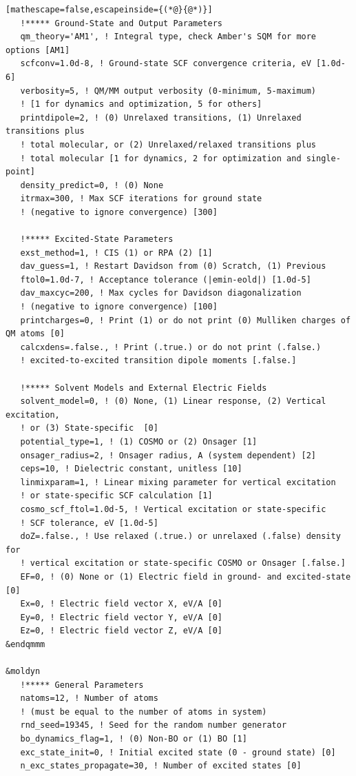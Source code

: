 \documentclass[letterpaper,12pt,titlepage]{article}
\begin{document}
\begin{appendix}
\begin{lstlisting}[mathescape=false,escapeinside={(*@}{@*)}]
   !***** Ground-State and Output Parameters
   qm_theory='AM1', ! Integral type, check Amber's SQM for more options [AM1]
   scfconv=1.0d-8, ! Ground-state SCF convergence criteria, eV [1.0d-6]
   verbosity=5, ! QM/MM output verbosity (0-minimum, 5-maximum)
   ! [1 for dynamics and optimization, 5 for others]
   printdipole=2, ! (0) Unrelaxed transitions, (1) Unrelaxed transitions plus 
   ! total molecular, or (2) Unrelaxed/relaxed transitions plus 
   ! total molecular [1 for dynamics, 2 for optimization and single-point]
   density_predict=0, ! (0) None
   itrmax=300, ! Max SCF iterations for ground state 
   ! (negative to ignore convergence) [300]

   !***** Excited-State Parameters
   exst_method=1, ! CIS (1) or RPA (2) [1]
   dav_guess=1, ! Restart Davidson from (0) Scratch, (1) Previous 
   ftol0=1.0d-7, ! Acceptance tolerance (|emin-eold|) [1.0d-5]
   dav_maxcyc=200, ! Max cycles for Davidson diagonalization 
   ! (negative to ignore convergence) [100]
   printcharges=0, ! Print (1) or do not print (0) Mulliken charges of QM atoms [0]
   calcxdens=.false., ! Print (.true.) or do not print (.false.) 
   ! excited-to-excited transition dipole moments [.false.]

   !***** Solvent Models and External Electric Fields
   solvent_model=0, ! (0) None, (1) Linear response, (2) Vertical excitation, 
   ! or (3) State-specific  [0]
   potential_type=1, ! (1) COSMO or (2) Onsager [1]
   onsager_radius=2, ! Onsager radius, A (system dependent) [2]
   ceps=10, ! Dielectric constant, unitless [10]
   linmixparam=1, ! Linear mixing parameter for vertical excitation
   ! or state-specific SCF calculation [1]
   cosmo_scf_ftol=1.0d-5, ! Vertical excitation or state-specific
   ! SCF tolerance, eV [1.0d-5]
   doZ=.false., ! Use relaxed (.true.) or unrelaxed (.false) density for 
   ! vertical excitation or state-specific COSMO or Onsager [.false.]
   EF=0, ! (0) None or (1) Electric field in ground- and excited-state [0]
   Ex=0, ! Electric field vector X, eV/A [0]
   Ey=0, ! Electric field vector Y, eV/A [0]
   Ez=0, ! Electric field vector Z, eV/A [0] 
&endqmmm

&moldyn
   !***** General Parameters
   natoms=12, ! Number of atoms 
   ! (must be equal to the number of atoms in system)
   rnd_seed=19345, ! Seed for the random number generator
   bo_dynamics_flag=1, ! (0) Non-BO or (1) BO [1]
   exc_state_init=0, ! Initial excited state (0 - ground state) [0]
   n_exc_states_propagate=30, ! Number of excited states [0]


\end{lstlisting}
\end{appendix}
\end{document}
